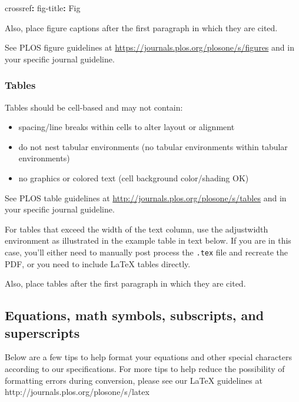 \documentclass[
  10pt,
  letterpaper,
]{article}
\newenvironment{Shaded}{\begin{snugshade}}{\end{snugshade}}
\newcommand{\AttributeTok}[1]{\textcolor[rgb]{0.40,0.45,0.13}{#1}}
\newcommand{\FunctionTok}[1]{\textcolor[rgb]{0.28,0.35,0.67}{#1}}
\newcommand{\KeywordTok}[1]{\textcolor[rgb]{0.00,0.23,0.31}{\textbf{#1}}}
\providecommand{\tightlist}{%
  \setlength{\itemsep}{0pt}\setlength{\parskip}{0pt}}
\begin{document}
\begin{Shaded}
\begin{Highlighting}[]
\FunctionTok{crossref}\KeywordTok{:}
\AttributeTok{  }\FunctionTok{fig{-}title}\KeywordTok{:}\AttributeTok{ Fig }
\end{Highlighting}
\end{Shaded}

Also, place figure captions after the first paragraph in which they are
cited.

See PLOS figure guidelines at
\url{https://journals.plos.org/plosone/s/figures} and in your specific
journal guideline.

\subsubsection{Tables}\label{tables}

Tables should be cell-based and may not contain:

\begin{itemize}
\tightlist
\item
  spacing/line breaks within cells to alter layout or alignment
\item
  do not nest tabular environments (no tabular environments within
  tabular environments)
\item
  no graphics or colored text (cell background color/shading OK)
\end{itemize}

See PLOS table guidelines at
\url{http://journals.plos.org/plosone/s/tables} and in your specific
journal guideline.

For tables that exceed the width of the text column, use the adjustwidth
environment as illustrated in the example table in text below. If you
are in this case, you'll either need to manually post process the
\texttt{.tex} file and recreate the PDF, or you need to include LaTeX
tables directly.

Also, place tables after the first paragraph in which they are cited.

\subsection{Equations, math symbols, subscripts, and
superscripts}\label{equations-math-symbols-subscripts-and-superscripts}

Below are a few tips to help format your equations and other special
characters according to our specifications. For more tips to help reduce
the possibility of formatting errors during conversion, please see our
LaTeX guidelines at http://journals.plos.org/plosone/s/latex
\end{document}
